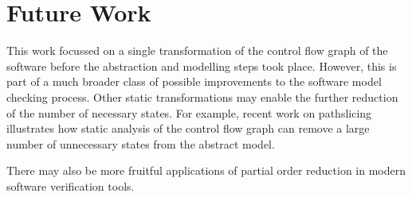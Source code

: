 \section{Future Work}

This work focussed on a single transformation of the
control flow graph of the software before the abstraction and
modelling steps took place.  However, this is part of a much broader
class of possible improvements to the software model checking process.
Other static transformations may enable the further reduction of the
number of necessary states.  For example, recent work on pathslicing
\cite{pathslicing} illustrates how static analysis of the control flow
graph can remove a large number of unnecessary states from the
abstract model.

There may also be more fruitful applications of partial order
reduction in modern software verification tools.

